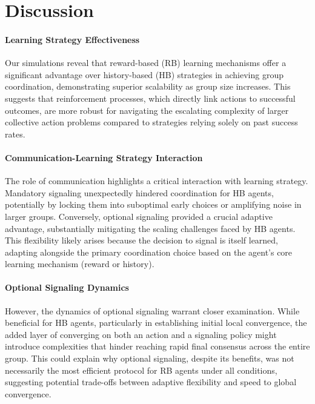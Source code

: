 \documentclass[12pt,a4paper]{article}
\begin{document}
\section{Discussion}

\paragraph{Learning Strategy Effectiveness} 
Our simulations reveal that reward-based (RB) learning mechanisms offer a significant advantage over history-based (HB) strategies in achieving group coordination, demonstrating superior scalability as group size increases. This suggests that reinforcement processes, which directly link actions to successful outcomes, are more robust for navigating the escalating complexity of larger collective action problems compared to strategies relying solely on past success rates.

\paragraph{Communication-Learning Strategy Interaction} 
The role of communication highlights a critical interaction with learning strategy. Mandatory signaling unexpectedly hindered coordination for HB agents, potentially by locking them into suboptimal early choices or amplifying noise in larger groups. Conversely, optional signaling provided a crucial adaptive advantage, substantially mitigating the scaling challenges faced by HB agents. This flexibility likely arises because the decision to signal is itself learned, adapting alongside the primary coordination choice based on the agent's core learning mechanism (reward or history).

\paragraph{Optional Signaling Dynamics} 
However, the dynamics of optional signaling warrant closer examination. While beneficial for HB agents, particularly in establishing initial local convergence, the added layer of converging on both an action and a signaling policy might introduce complexities that hinder reaching rapid final consensus across the entire group. This could explain why optional signaling, despite its benefits, was not necessarily the most efficient protocol for RB agents under all conditions, suggesting potential trade-offs between adaptive flexibility and speed to global convergence.
\end{document}
